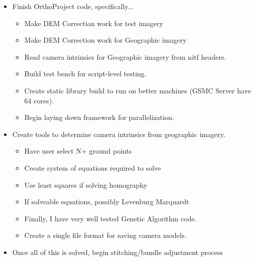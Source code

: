 \documentclass[12pt]{report}
\begin{document}
\begin{itemize}
\item Finish OrthoProject code, specifically...
    \begin{itemize}
    \item Make DEM Correction work for test imagery 
    \item Make DEM Correction work for Geographic imagery
    \item Read camera intrinsics for Geographic imagery from nitf headers.
    \item Build test bench for script-level testing.
    \item Create static library build to run on better machines (GSMC Server have 64 cores).
    \item Begin laying down framework for parallelization.
    \end{itemize}
\item Create tools to determine camera intrinsics from geographic imagery.
    \begin{itemize}
    \item Have user select N+ ground points
    \item Create system of equations required to solve
    \item Use least squares if solving homography
    \item If solveable equations, possibly Levenburg Marquardt
    \item Finally, I have very well tested Genetic Algorithm code.
    \item Create a single file format for saving camera models. 
    \end{itemize}
\item Once all of this is solved, begin stitching/bundle adjustment process
\end{itemize}
\end{document}
